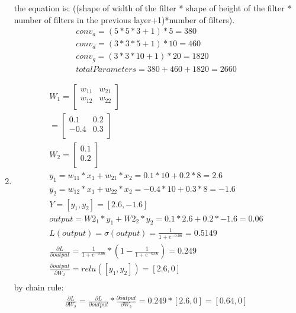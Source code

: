 \documentclass[12pt]{article}
\begin{document}
\begin{enumerate}
    the equation is: ((shape of width of the filter * shape of height of the filter * number of filters in the previous layer+1)*number of filters). 
    \begin{align}
    conv_a = (5 * 5 * 3  + 1) * 5 = 380 \\
    conv_d = (3 * 3 * 5  + 1) * 10 = 460 \\
    conv_g = (3 * 3 * 10 + 1) * 20 = 1820 \\
    totalParameters = 380 + 460 + 1820 = 2660
    \end{align}
\item 
    \begin{align}
      W_1 = \begin{bmatrix}
        w_{11} & w_{21}\\
        w_{12} & w_{22}\\
      \end{bmatrix} \\ = \begin{bmatrix}
        0.1 & 0.2\\
        -0.4 & 0.3\\
      \end{bmatrix} \\
    W_2 = \begin{bmatrix}
      0.1\\
      0.2\\
    \end{bmatrix} \\
    y_1 = w_{11} * x_1 + w_{21} * x_2 = 0.1 * 10 + 0.2 * 8 = 2.6 \\
    y_2 = w_{12} * x_1 + w_{22} * x_2 = -0.4 * 10 + 0.3 * 8 = -1.6 \\
    Y = [y_1, y_2] = [2.6, -1.6] \\
    output = W2_1 * y_1 + W2_2 * y_2 = 0.1 * 2.6 + 0.2 * -1.6 = 0.06 \\
    L(output) = \sigma(output) = \frac{1}{1 + e^{-0.06}} = 0.5149 \\
    \frac{\partial L}{\partial output} = \frac{1}{1 + e^{-0.06}} * (1 - \frac{1}{1 + e^{-0.06}}) = 0.249 \\
    \frac{\partial output}{\partial W_2} = relu([y_1, y_2]) = [2.6, 0] \\
    \end{align}
    by chain rule:
    \begin{align}
    \frac{\partial L}{\partial W_2} = \frac{\partial L}{\partial output} * \frac{\partial output}{\partial W_2} = 0.249 * [2.6, 0] = [0.64, 0]
    \end{align}

\end{enumerate}
\end{document}
